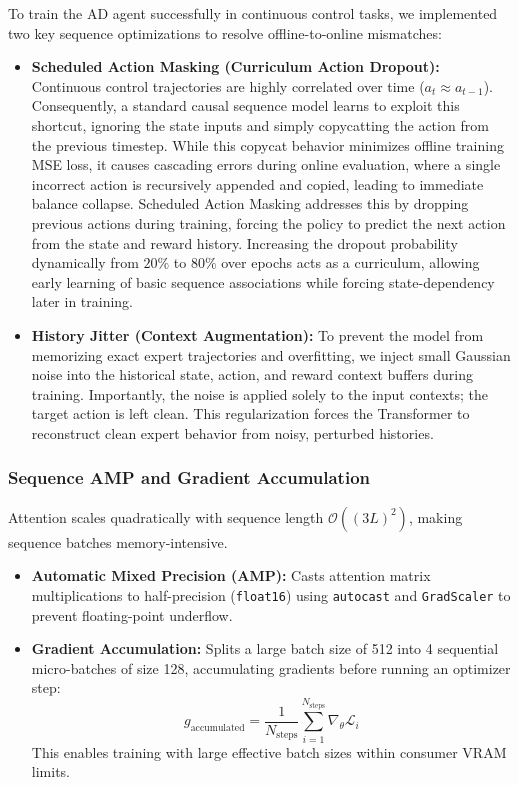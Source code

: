 \documentclass[11pt,a4paper]{article}
\begin{document}
To train the AD agent successfully in continuous control tasks, we implemented two key sequence optimizations to resolve offline-to-online mismatches:
\begin{itemize}
    \item \textbf{Scheduled Action Masking (Curriculum Action Dropout):} Continuous control trajectories are highly correlated over time ($a_t \approx a_{t-1}$). Consequently, a standard causal sequence model learns to exploit this shortcut, ignoring the state inputs and simply copycatting the action from the previous timestep. While this copycat behavior minimizes offline training MSE loss, it causes cascading errors during online evaluation, where a single incorrect action is recursively appended and copied, leading to immediate balance collapse. Scheduled Action Masking addresses this by dropping previous actions during training, forcing the policy to predict the next action from the state and reward history. Increasing the dropout probability dynamically from $20\%$ to $80\%$ over epochs acts as a curriculum, allowing early learning of basic sequence associations while forcing state-dependency later in training.
    \item \textbf{History Jitter (Context Augmentation):} To prevent the model from memorizing exact expert trajectories and overfitting, we inject small Gaussian noise into the historical state, action, and reward context buffers during training. Importantly, the noise is applied solely to the input contexts; the target action is left clean. This regularization forces the Transformer to reconstruct clean expert behavior from noisy, perturbed histories.
\end{itemize}

\subsubsection{Sequence AMP and Gradient Accumulation}
Attention scales quadratically with sequence length $\mathcal{O}((3L)^2)$, making sequence batches memory-intensive. 
\begin{itemize}
    \item \textbf{Automatic Mixed Precision (AMP):} Casts attention matrix multiplications to half-precision (\texttt{float16}) using \texttt{autocast} and \texttt{GradScaler} to prevent floating-point underflow.
    \item \textbf{Gradient Accumulation:} Splits a large batch size of 512 into 4 sequential micro-batches of size 128, accumulating gradients before running an optimizer step:
    \begin{equation}
    g_{\text{accumulated}} = \frac{1}{N_{\text{steps}}} \sum_{i=1}^{N_{\text{steps}}} \nabla_{\theta} \mathcal{L}_i
    \end{equation}
    This enables training with large effective batch sizes within consumer VRAM limits.
\end{itemize}
\end{document}
